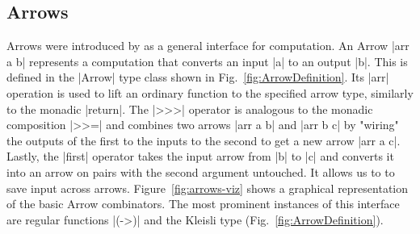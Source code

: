\subsection{Arrows}
\label{sec:arrows}
Arrows were introduced by \citet{HughesArrows} as a general interface for computation. An Arrow |arr a b| represents  a computation that converts an input |a| to an output |b|. This is defined in the |Arrow| type class shown in Fig.~\ref{fig:ArrowDefinition}.
%
Its |arr| operation is used to lift an ordinary function to the specified arrow type, similarly to the monadic |return|. The |>>>| operator is analogous to the monadic composition  |>>=| and combines two arrows |arr a b| and |arr b c| by "wiring" the outputs of the first to the inputs to the second to get a new arrow |arr a c|. Lastly, the |first| operator  takes the input arrow from |b| to |c| and converts it into an arrow on pairs with the second argument untouched. It allows us to to save input across arrows. Figure~\ref{fig:arrows-viz} shows a graphical representation of the basic Arrow combinators.
The most prominent instances of this interface are regular functions |(->)|
and the Kleisli type (Fig.~\ref{fig:ArrowDefinition}).

